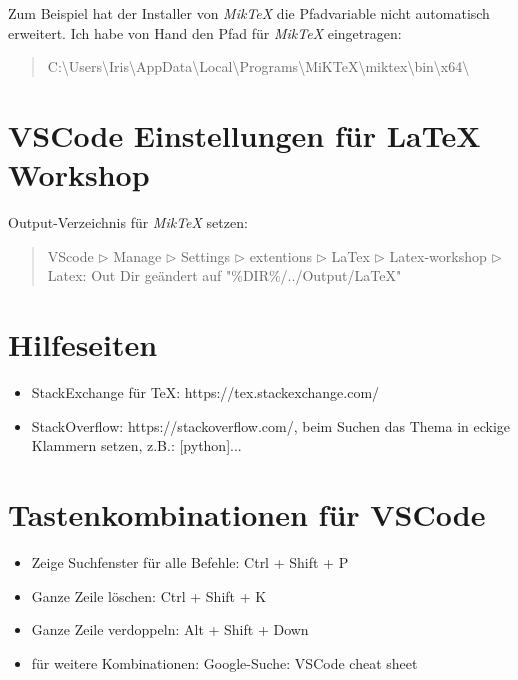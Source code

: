 \documentclass[a4paper]{article} %
\begin{document}
    Zum Beispiel hat der Installer von \textsl{MikTeX} die Pfadvariable
    nicht automatisch erweitert.
    Ich habe von Hand den Pfad für \textsl{MikTeX} eingetragen:
    \begin{quote}
        C:\textbackslash Users\textbackslash Iris\textbackslash AppData\textbackslash Local\textbackslash Programs\textbackslash MiKTeX\textbackslash miktex\textbackslash bin\textbackslash x64\textbackslash 
    \end{quote}

    \section{VSCode Einstellungen für LaTeX Workshop} %
   
    Output-Verzeichnis für \textsl{MikTeX} setzen:
    \begin{quote}
        VScode $\triangleright$ Manage $\triangleright$ Settings $\triangleright$ extentions $\triangleright$ LaTex $\triangleright$ Latex-workshop $\triangleright$ Latex: Out Dir
        geändert auf "\%DIR\%/../Output/LaTeX"
    \end{quote}

    \section{Hilfeseiten} %
  
    \begin{itemize}
        \item StackExchange für TeX: https://tex.stackexchange.com/
        \item StackOverflow: https://stackoverflow.com/,
        beim Suchen das Thema in eckige Klammern setzen,
        z.B.: [python]...
    \end{itemize}

    \section{Tastenkombinationen für VSCode} %
  
    \begin{itemize}
       \item Zeige Suchfenster für alle Befehle: Ctrl + Shift + P
       \item Ganze Zeile löschen: Ctrl + Shift + K
       \item Ganze Zeile verdoppeln: Alt + Shift + Down
       \item für weitere Kombinationen: Google-Suche: VSCode cheat sheet
    \end{itemize}
      
\end{document}
